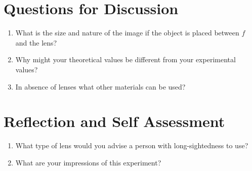 \section{Questions for Discussion}
\begin{enumerate}
\item What is the size and nature of the image if the object is placed between $f$ and the lens?
\item Why might your theoretical values be different from your experimental values?
\item In absence of lenses what other materials can be used?
\end{enumerate}

\section{Reflection and Self Assessment}
\begin{enumerate}
\item What type of lens would you advise a person with long-sightedness to use?
\item What are your impressions of this experiment?
\end{enumerate}